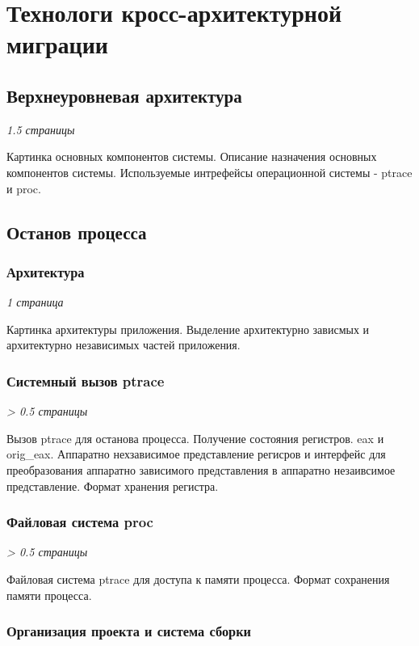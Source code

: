 \chapter{Технологи кросс-архитектурной миграции}

\section{Верхнеуровневая архитектура}

\textit{1.5 страницы}

Картинка основных компонентов системы. Описание назначения основных компонентов системы. Используемые интрефейсы операционной системы - ptrace и proc.

\section{Останов процесса}

\subsection{Архитектура}

\textit{1 страница}

Картинка архитектуры приложения. Выделение архитектурно зависмых и архитектурно независимых частей приложения.

\subsection{Системный вызов ptrace}

\textit{> 0.5 страницы}

Вызов ptrace для останова процесса. Получение состояния регистров. eax и orig\_eax. Аппаратно нехзависимое представление регисров и интерфейс для преобразования аппаратно зависимого представления в аппаратно незаивсимое представление. Формат хранения регистра.

\subsection{Файловая система proc}

\textit{> 0.5 страницы}

Файловая система ptrace для доступа к памяти процесса. Формат сохранения памяти процесса.

\subsection{Организация проекта и система сборки}

